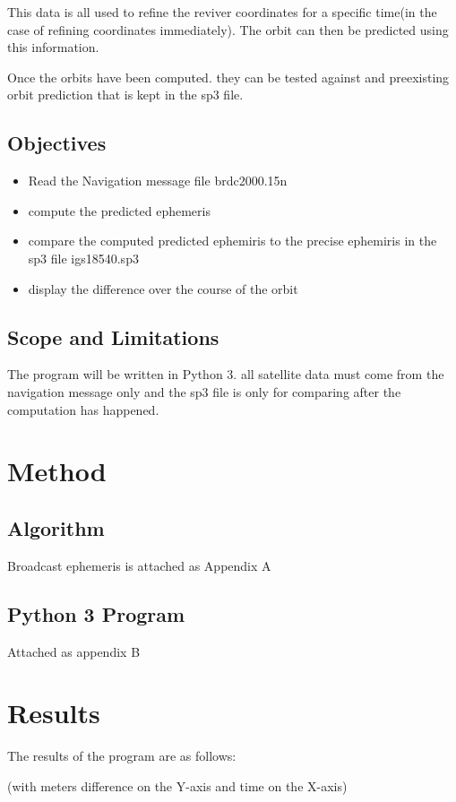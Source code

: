 \documentclass[12pt,a4paper]{article}
\begin{document}
		This data is all used to refine the reviver coordinates for a specific time(in the case of refining coordinates immediately). The orbit can then be predicted using this information.
		
		Once the orbits have been computed. they can be tested against and preexisting orbit prediction that is kept in the sp3 file.
	
		
		\subsection{Objectives}
		\begin{itemize}
			\item Read the Navigation message file brdc2000.15n
			\item compute the predicted ephemeris
			\item compare the computed predicted ephemiris to the precise ephemiris in the sp3 file igs18540.sp3
			\item display the difference over the course of the orbit
		\end{itemize}
		
		\subsection{Scope and Limitations}
		The program will be written in Python 3. all satellite data must come from the navigation message only and the sp3 file is only for comparing after the computation has happened.
		
	\newpage
	\section{Method}
		\subsection{Algorithm}
			Broadcast ephemeris is attached as Appendix A
		\subsection{Python 3 Program}
			Attached as appendix B
	
	\newpage
	\section{Results}
	The results of the program are as follows:
	
	(with meters difference on the Y-axis and time on the X-axis)
	
\end{document}
